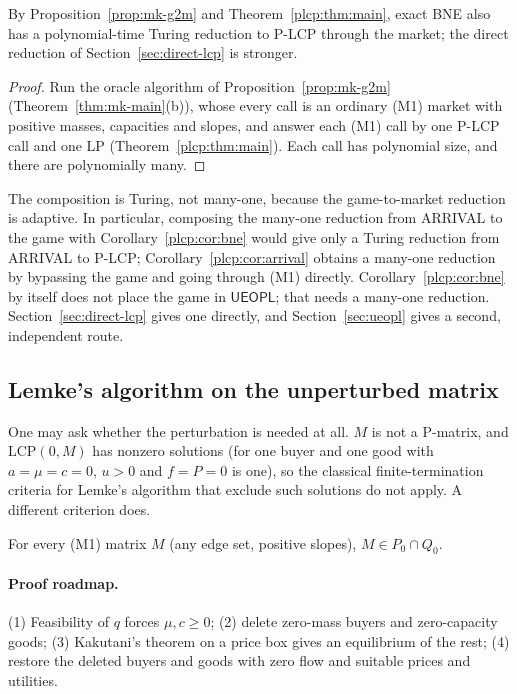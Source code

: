 \begin{remark}\label{plcp:cor:bne}
By Proposition~\ref{prop:mk-g2m} and Theorem~\ref{plcp:thm:main}, exact BNE also has a polynomial-time Turing reduction to P-LCP through the market; the direct reduction of Section~\ref{sec:direct-lcp} is stronger.
\end{remark}

\begin{proof}
Run the oracle algorithm of Proposition~\ref{prop:mk-g2m} (Theorem~\ref{thm:mk-main}(b)), whose every
call is an ordinary (M1) market with positive masses, capacities and slopes, and answer each (M1) call by
one P-LCP call and one LP (Theorem~\ref{plcp:thm:main}). Each call has polynomial size, and there are
polynomially many.
\end{proof}

The composition is Turing, not many-one, because the game-to-market reduction is adaptive. In
particular, composing the many-one reduction from ARRIVAL to the game with
Corollary~\ref{plcp:cor:bne} would give only a Turing reduction from ARRIVAL to P-LCP;
Corollary~\ref{plcp:cor:arrival} obtains a many-one reduction by bypassing the game and going through
(M1) directly. Corollary~\ref{plcp:cor:bne} by itself does not place the game in $\mathsf{UEOPL}$; that needs
a many-one reduction. Section~\ref{sec:direct-lcp} gives one directly, and Section~\ref{sec:ueopl} gives a second,
independent route.

\subsection{Lemke's algorithm on the unperturbed matrix}

One may ask whether the perturbation is needed at all. $M$ is not a P-matrix, and $\mathrm{LCP}(0,M)$
has nonzero solutions (for one buyer and one good with $a=\mu=c=0$, $u>0$ and $f=P=0$ is one), so the
classical finite-termination criteria for Lemke's algorithm that exclude such solutions do not apply. A
different criterion does.

\begin{proposition}[$Q_0$]\label{plcp:prop:q0}
\statusrefereed
For every (M1) matrix $M$ (any edge set, positive slopes), $M\in P_0\cap Q_0$.
\end{proposition}

\paragraph{Proof roadmap.} (1) Feasibility of $q$ forces $\mu,c\ge0$; (2) delete zero-mass buyers and
zero-capacity goods; (3) Kakutani's theorem on a price box gives an equilibrium of the rest; (4) restore
the deleted buyers and goods with zero flow and suitable prices and utilities.

